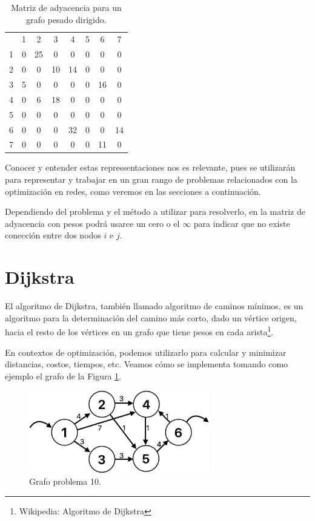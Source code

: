 \documentclass[12pt]{article}  %
\begin{document}
\begin{table}
\centering
\caption{Matriz de adyacencia para un grafo pesado dirigido.}
\label{tab:matAdjEjem2}
\begin{tabular}{cccccccc}
&1&2&3&4&5&6&7\\
1&0&25&0&0&0&0&0\\
2&0&0&10&14&0&0&0\\
3&5&0&0&0&0&16&0\\
4&0&6&18&0&0&0&0\\
5&0&0&0&0&0&0&0\\
6&0&0&0&32&0&0&14\\
7&0&0&0&0&0&11&0
\end{tabular}
\end{table}

Conocer y entender estas repressentaciones nos es relevante, pues se utilizarán para representar y trabajar en un gran rango de problemas relacionados con la optimización en redes, como veremos en las secciones a continuación.

Dependiendo del problema y el método a utilizar para resolverlo, en la matriz de adyacencia con pesos podrá usarce un cero o el $\infty$ para indicar que no existe conección entre dos nodos $i$ e $j$.

\section{Dijkstra}
El algoritmo de Dijkstra, también llamado algoritmo de caminos mínimos, es un algoritmo para la determinación del camino más corto, dado un vértice origen, hacia el resto de los vértices en un grafo que tiene pesos en cada arista\footnote{Wikipedia: Algoritmo de Dijkstra}.

En contextos de optimización, podemos utilizarlo para calcular y minimizar distancias, costos, tiempos, etc. Veamos cómo se implementa tomando como ejemplo el grafo de la Figura \ref{fig:grafoProb10}.

\begin{figure}[H]
\centering
\caption{Grafo problema 10.}
\label{fig:grafoProb10}
\includegraphics[width=0.7\textwidth]{assets/grafoProb10.png}
\end{figure}
\end{document}
